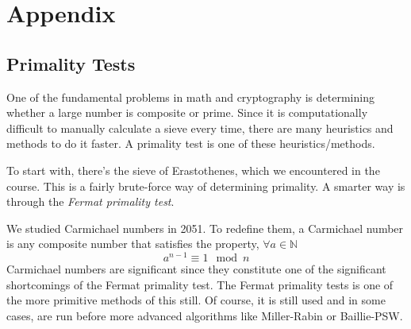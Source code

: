 \documentclass[conference]{IEEEtran}
\begin{document}
\section{Appendix}
\subsection{Primality Tests}
One of the fundamental problems in math and cryptography is determining whether a large number is composite or prime. Since it is computationally difficult to manually calculate a sieve every time, there are many heuristics and methods to do it faster. A primality test is one of these heuristics/methods.

To start with, there's the sieve of Erastothenes, which we encountered in the course. This is a fairly brute-force way of determining primality. A smarter way is through the \textit{Fermat primality test}.

We studied Carmichael numbers in 2051. To redefine them, a Carmichael number is any composite number that satisfies the property, $\forall a \in \mathbb{N}$
\[
    a^{n -1} \equiv 1 \mod n 
\]
Carmichael numbers are significant since they constitute one of the significant shortcomings of the Fermat primality test. The Fermat primality tests is one of the more primitive methods of this still. Of course, it is still used and in some cases, are run before more advanced algorithms like Miller-Rabin or Baillie-PSW.
\end{document}
